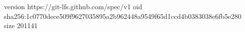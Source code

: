 version https://git-lfs.github.com/spec/v1
oid sha256:1c0770dece509f9627035895a2b962448a9549f65d1ccd4b0383038e6fb5e280
size 201141
